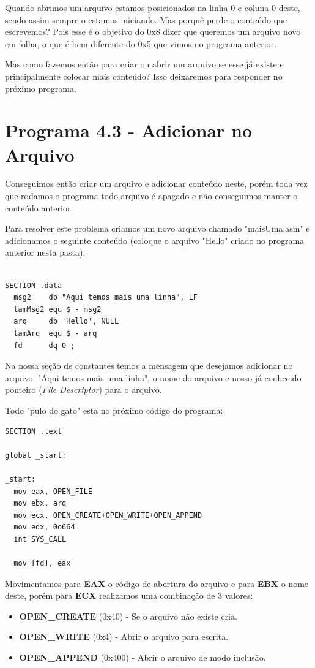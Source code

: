 Quando abrimos um arquivo estamos posicionados na linha 0 e coluna 0 deste, sendo assim sempre o estamos iniciando. Mas porquê perde o conteúdo que escrevemos? Pois esse é o objetivo do 0x8 dizer que queremos um arquivo novo em folha, o que é bem diferente do 0x5 que vimos no programa anterior.

Mas como fazemos então para criar ou abrir um arquivo se esse já existe e principalmente colocar mais conteúdo? Isso deixaremos para responder no próximo programa.

\section{Programa 4.3 - Adicionar no Arquivo}
Conseguimos então criar um arquivo e adicionar conteúdo neste, porém toda vez que rodamos o programa todo arquivo é apagado e não conseguimos manter o conteúdo anterior.

Para resolver este problema criamos um novo arquivo chamado "maisUma.asm" e adicionamos o seguinte conteúdo (coloque o arquivo "Hello" criado no programa anterior nesta pasta):
\begin{lstlisting}[]
%include 'bibliotecaE.inc'

SECTION .data
  msg2    db "Aqui temos mais uma linha", LF
  tamMsg2 equ $ - msg2
  arq     db 'Hello', NULL
  tamArq  equ $ - arq
  fd      dq 0 ;
\end{lstlisting}

Na nossa seção de constantes temos a mensagem que desejamos adicionar no arquivo: "Aqui temos mais uma linha", o nome do arquivo e nosso já conhecido ponteiro (\textit{File Descriptor}) para o arquivo.

Todo "pulo do gato" esta no próximo código do programa:
\begin{lstlisting}[]
SECTION .text

global _start:

_start:
  mov eax, OPEN_FILE
  mov ebx, arq
  mov ecx, OPEN_CREATE+OPEN_WRITE+OPEN_APPEND
  mov edx, 0o664
  int SYS_CALL
  
  mov [fd], eax	
\end{lstlisting}	

Movimentamos para \textbf{EAX} o código de abertura do arquivo e para \textbf{EBX} o nome deste, porém para \textbf{ECX} realizamos uma combinação de 3 valores:
\begin{itemize}[nolistsep]
	\item \textbf{OPEN\_CREATE} (0x40) - Se o arquivo não existe cria.
	\item \textbf{OPEN\_WRITE} (0x4) - Abrir o arquivo para escrita.
	\item \textbf{OPEN\_APPEND} (0x400) - Abrir o arquivo de modo inclusão.
\end{itemize}	

